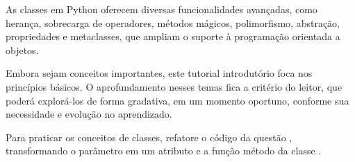 As classes em Python oferecem diversas funcionalidades avançadas, como herança, sobrecarga de operadores, métodos
mágicos, polimorfismo, abstração, propriedades e metaclasses, que ampliam o suporte à programação orientada a objetos.

Embora sejam conceitos importantes, este tutorial introdutório foca nos princípios básicos.
O aprofundamento nesses temas fica a critério do leitor, que poderá explorá-los de forma gradativa, em um momento
oportuno, conforme sua necessidade e evolução no aprendizado.

Para praticar os conceitos de classes, refatore o código da questão , transformando o parâmetro
 em um atributo e a função  método
da classe .



